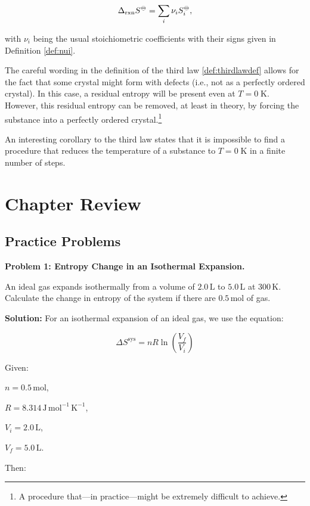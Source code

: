 \documentclass[
  9pt,
]{extbook}
\theoremstyle{definition}
\theoremstyle{definition}
\theoremstyle{definition}
\theoremstyle{definition}
\theoremstyle{remark}
\begin{document}
\begin{equation}
\Delta_{\text{rxn}} S^{-\kern-6pt{\ominus}\kern-6pt-}= \sum_i \nu_i S_i^{-\kern-6pt{\ominus}\kern-6pt-},
\label{eq:thirdlaweq}
\end{equation}

with \(\nu_i\) being the usual stoichiometric coefficients with their signs given in Definition \ref{def:nui}.

The careful wording in the definition of the third law \ref{def:thirdlawdef} allows for the fact that some crystal might form with defects (i.e., not as a perfectly ordered crystal). In this case, a residual entropy will be present even at \(T=0 \; \text{K}\). However, this residual entropy can be removed, at least in theory, by forcing the substance into a perfectly ordered crystal.\footnote{A procedure that---in practice---might be extremely difficult to achieve.}

An interesting corollary to the third law states that it is impossible to find a procedure that reduces the temperature of a substance to \(T=0 \; \text{K}\) in a finite number of steps.

\section{Chapter Review}\label{rev7}

\subsection{Practice Problems}\label{exer7}

\textbf{Problem 1: Entropy Change in an Isothermal Expansion.}

An ideal gas expands isothermally from a volume of \(2.0\,\text{L}\) to \(5.0\,\text{L}\) at \(300\,\text{K}\). Calculate the change in entropy of the system if there are \(0.5\,\text{mol}\) of gas.

\textbf{Solution:} For an isothermal expansion of an ideal gas, we use the equation:

\[\Delta S^{\text{sys}} = nR \ln \left(\frac{V_f}{V_i}\right)\]

Given:

\(n = 0.5\,\text{mol}\),

\(R = 8.314\,\text{J} \, \text{mol}^{-1} \, \text{K}^{-1}\),

\(V_i = 2.0\,\text{L}\),

\(V_f = 5.0\,\text{L}\).

Then:
\end{document}
